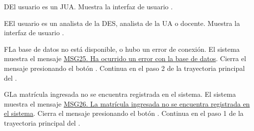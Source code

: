 \begin{UCtrayectoriaA}{D}{El usuario es un JUA.}
    \UCpaso Muestra la interfaz de usuario .
\end{UCtrayectoriaA}


\begin{UCtrayectoriaA}{E}{El usuario es un analista de la DES, analista de la UA o docente.}
    \UCpaso Muestra la interfaz de usuario .
\end{UCtrayectoriaA}


\begin{UCtrayectoriaA}{F}{La base de datos no está disponible, o hubo un error de conexión.}
    \UCpaso El sistema muestra el mensaje \hyperref[MSG25]{MSG25. Ha ocurrido un error con la base de datos}.
    \UCpaso[\UCactor] Cierra el mensaje presionando el botón .
    \UCpaso Continua en el paso 2 de la trayectoria principal del .
\end{UCtrayectoriaA}


\begin{UCtrayectoriaA}{G}{La matrícula ingresada no se encuentra registrada en el sistema.}
    \UCpaso El sistema muestra el mensaje \hyperref[MSG26]{MSG26. La matrícula ingresada no se encuentra registrada en el sistema}.
    \UCpaso[\UCactor] Cierra el mensaje presionando el botón .
    \UCpaso Continua en el paso 1 de la trayectoria principal del .
\end{UCtrayectoriaA}
